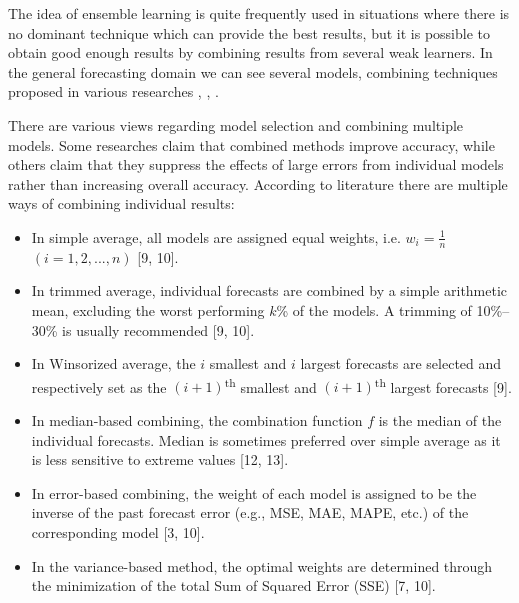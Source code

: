 The idea of ensemble learning is quite frequently used in situations where there is no dominant technique which can provide the best results, but it is possible to obtain good enough results by combining results from several weak learners. In the general forecasting domain we can see several models, combining techniques proposed in various researches \cite{Zou_2004}, \cite{Wagner_2011},
\cite{Zhang_2003}.  

There are various views regarding model selection and combining multiple models. Some researches claim that combined methods improve accuracy, while others claim that they suppress the effects of large errors from individual models rather than increasing overall accuracy. According to literature there are multiple ways of combining individual results:
\begin{itemize}
\item In simple average, all models are assigned equal weights, i.e. $w_{i}=\frac{1}{n}$ $(i=1, 2,..., n)$ [9, 10].
\item In trimmed average, individual forecasts are combined by a simple arithmetic mean, excluding the worst performing $k$\% of the models. A trimming of 10\%–30\% is usually recommended [9, 10].
\item In Winsorized average, the $i$ smallest and $i$ largest forecasts are selected and respectively set as the $(i+1)$\textsuperscript{th} smallest and $(i+1)$\textsuperscript{th} largest forecasts [9].
\item In median-based combining, the combination function $f$ is the median of the individual forecasts. Median is sometimes preferred over simple average as it is less sensitive to extreme values [12, 13].
\item In error-based combining, the weight of each model is assigned to be the inverse of the past forecast error (e.g., MSE, MAE, MAPE, etc.) of the corresponding model [3, 10].
\item In the variance-based method, the optimal weights are determined through the minimization of the total Sum of Squared Error (SSE) [7, 10].
\end{itemize}